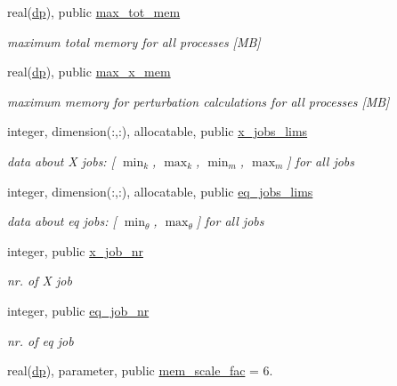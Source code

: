 \begin{DoxyCompactItemize}
real(\hyperlink{namespacenum__vars_a03802aa2bd86439d7a9370836fabf3f2}{dp}), public \hyperlink{namespacenum__vars_ae50396b7028248358850b4524cf84433}{max\+\_\+tot\+\_\+mem}
\begin{DoxyCompactList}\small\item\em maximum total memory for all processes \mbox{[}MB\mbox{]} \end{DoxyCompactList}\item 
real(\hyperlink{namespacenum__vars_a03802aa2bd86439d7a9370836fabf3f2}{dp}), public \hyperlink{namespacenum__vars_af86827817455d27248f5660c3d616283}{max\+\_\+x\+\_\+mem}
\begin{DoxyCompactList}\small\item\em maximum memory for perturbation calculations for all processes \mbox{[}MB\mbox{]} \end{DoxyCompactList}\item 
integer, dimension(\+:,\+:), allocatable, public \hyperlink{namespacenum__vars_a476c029a4a53aa1f707d54d18d3c80a0}{x\+\_\+jobs\+\_\+lims}
\begin{DoxyCompactList}\small\item\em data about X jobs\+: \mbox{[} $\min_k$, $\max_k$, $\min_m$, $\max_m$\mbox{]} for all jobs \end{DoxyCompactList}\item 
integer, dimension(\+:,\+:), allocatable, public \hyperlink{namespacenum__vars_a725aecf3a6f55fee53a5fe3b759d6a25}{eq\+\_\+jobs\+\_\+lims}
\begin{DoxyCompactList}\small\item\em data about eq jobs\+: \mbox{[} $\min_\theta$, $\max_\theta$\mbox{]} for all jobs \end{DoxyCompactList}\item 
integer, public \hyperlink{namespacenum__vars_a9df427f6582f4528652b3607d1c681b3}{x\+\_\+job\+\_\+nr}
\begin{DoxyCompactList}\small\item\em nr. of X job \end{DoxyCompactList}\item 
integer, public \hyperlink{namespacenum__vars_adfff3a032694d6c26e780019772d4cc1}{eq\+\_\+job\+\_\+nr}
\begin{DoxyCompactList}\small\item\em nr. of eq job \end{DoxyCompactList}\item 
real(\hyperlink{namespacenum__vars_a03802aa2bd86439d7a9370836fabf3f2}{dp}), parameter, public \hyperlink{namespacenum__vars_a37e3db17f8acca3f59bb15381848aa6e}{mem\+\_\+scale\+\_\+fac} = 6.

\end{DoxyCompactItemize}
